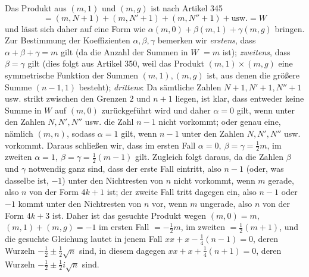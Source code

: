 Das Produkt aus \((m,1)\) und \((m,g)\) ist nach Artikel 345 \[=(m,N+1)+(m,N'+1)+(m,N''+1)+\text{usw.}=W\] und lässt sich daher auf eine Form wie \(\alpha(m,0)+\beta(m,1)+\gamma(m,g)\) bringen. Zur Bestimmung der Koeffizienten \(\alpha,\allowbreak \beta,\allowbreak \gamma\) bemerken wir \textit{erstens}, dass \(\alpha+\beta+\gamma=m\) gilt (da die Anzahl der Summen in \(W\) \(=m\) ist); \textit{zweitens}, dass \(\beta=\gamma\) gilt (dies folgt aus Artikel 350, weil das Produkt \((m,1)\times(m,g)\) eine symmetrische Funktion der Summen \((m,1),\allowbreak (m,g)\) ist, aus denen die größere Summe \((n-1,1)\) besteht); \textit{drittens}: Da sämtliche Zahlen \(N+1,\allowbreak N'+1,\allowbreak N''+1\) usw. strikt zwischen den Grenzen \(2\) und \(n+1\) liegen, ist klar, dass entweder keine Summe in \(W\) auf \((m,0)\) zurückgeführt wird und daher \(\alpha=0\) gilt, wenn unter den Zahlen \(N,\allowbreak N',\allowbreak N''\) usw. die Zahl \(n-1\) nicht vorkommt; oder genau eine, nämlich \((m,n)\), sodass \(\alpha=1\) gilt, wenn \(n-1\) unter den Zahlen \(N,\allowbreak N',\allowbreak N''\) usw. vorkommt. Daraus schließen wir, dass im ersten Fall \(\alpha=0,\allowbreak \ \beta=\gamma=\frac12m\), im zweiten \(\alpha=1,\allowbreak \ \beta=\gamma=\frac12(m-1)\) gilt. Zugleich folgt daraus, da die Zahlen \(\beta\) und \(\gamma\) notwendig ganz sind, dass der erste Fall eintritt, also \(n-1\) (oder, was dasselbe ist, \(-1\)) unter den Nichtresten von \(n\) nicht vorkommt, wenn \(m\) gerade, also \(n\) von der Form \(4k+1\) ist; der zweite Fall tritt dagegen ein, also \(n-1\) oder \(-1\) kommt unter den Nichtresten von \(n\) vor, wenn \(m\) ungerade, also \(n\) von der Form \(4k+3\) ist. Daher ist das gesuchte Produkt wegen \((m,0)=m\), \((m,1)+(m,g)=-1\) im ersten Fall \(=-\frac12m\), im zweiten \(=\frac12(m+1)\), und die gesuchte Gleichung lautet in jenem Fall \(xx+x-\frac14(n-1)=0\), deren Wurzeln \(-\frac12\pm\frac12\surd n\) sind, in diesem dagegen \(xx+x+\frac14(n+1)=0\), deren Wurzeln \(-\frac12\pm\frac12i\surd n\) sind.

